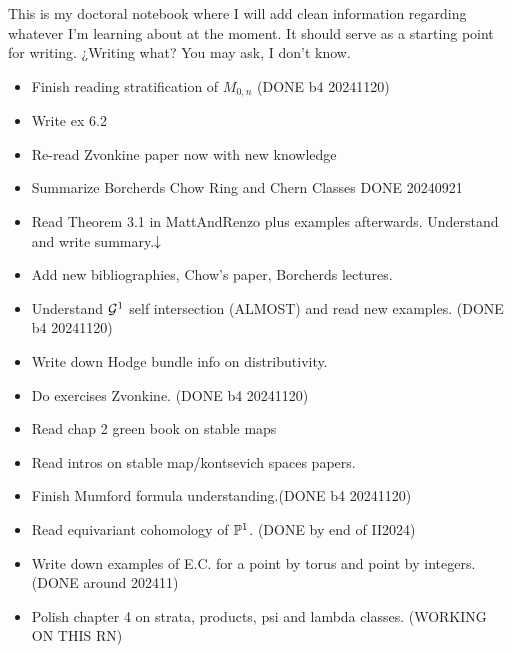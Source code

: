 \documentclass[12pt]{memoir}
\author{\nauthor}
\begin{document}
{\small 
\setlength{\parindent}{0em}
\setlength{\parskip}{1em}

This is my doctoral notebook where I will add clean information regarding whatever I'm learning about at the moment. It should serve as a starting point for writing. ¿Writing what? You may ask, I don't know.

\begin{itemize}
    \item Finish reading stratification of $M_{0,n}$ (DONE b4 20241120) 
    \item Write ex 6.2
    \item Re-read Zvonkine paper now with new knowledge
    \item Summarize Borcherds Chow Ring and Chern Classes DONE 20240921
\end{itemize}
\begin{itemize}
    \item Read Theorem 3.1 in MattAndRenzo plus examples afterwards. Understand and write summary.$\downarrow$
    \item Add new bibliographies, Chow's paper, Borcherds lectures.
\end{itemize}
\begin{itemize}
    \item Understand $\mathcal{G}^1$ self intersection (ALMOST) and read new examples. (DONE b4 20241120)
    \item Write down Hodge bundle info on distributivity.
    \item Do exercises Zvonkine. (DONE b4 20241120)
\end{itemize}
\begin{itemize}
    \item Read chap 2 green book on stable maps
    \item Read intros on stable map/kontsevich spaces papers.
    \item Finish Mumford formula understanding.(DONE b4 20241120)
\end{itemize}
\begin{itemize}
    \item Read equivariant cohomology of $\mathbb{P}^1$. (DONE by end of II2024)
    \item Write down examples of E.C. for a point by torus and point by integers. (DONE around 202411)
    \item Polish chapter 4 on strata, products, psi and lambda classes. (WORKING ON THIS RN)

\end{itemize}}
\end{document}
